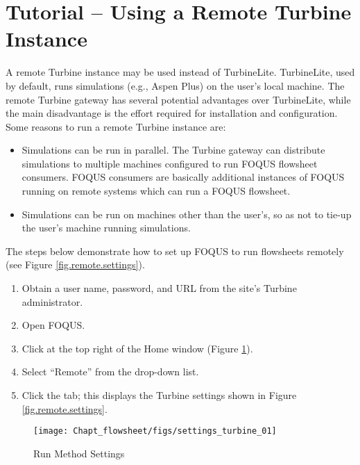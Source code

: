 \section{Tutorial -- Using a Remote Turbine Instance}\label{tutorial.fs.remote.turbine}

A remote Turbine instance may be used instead of TurbineLite. TurbineLite, used by default, runs simulations (e.g., Aspen Plus) on the user's local machine. The remote Turbine gateway has several potential advantages over TurbineLite, while the main disadvantage is the effort required for installation and configuration. Some reasons to run a remote Turbine instance are:
\begin{itemize}
	\item Simulations can be run in parallel.  The Turbine gateway can distribute simulations to multiple machines configured to run FOQUS flowsheet consumers.  FOQUS consumers are basically additional instances of FOQUS running on remote systems which can run a FOQUS flowsheet.
	\item Simulations can be run on machines other than the user's, so as not to tie-up the user's machine running simulations. 
\end{itemize}

The steps below demonstrate how to set up FOQUS to run flowsheets remotely (see Figure \ref{fig.remote.settings}).

\begin{enumerate}
\item Obtain a user name, password, and URL from the site's Turbine administrator.
\item Open FOQUS.
\item Click  at the top right of the Home window (Figure \ref{fig.remote.settings1}).
\item Select ``Remote'' from the  drop-down list.
\item Click the  tab; this displays the Turbine settings shown in Figure \ref{fig.remote.settings}.
\end{enumerate}

\begin{figure}[H]
	\begin{center}
		\texttt{[image: Chapt\_flowsheet/figs/settings\_turbine\_01]}
		\caption{Run Method Settings}
		\label{fig.remote.settings1}
	\end{center}
\end{figure}

